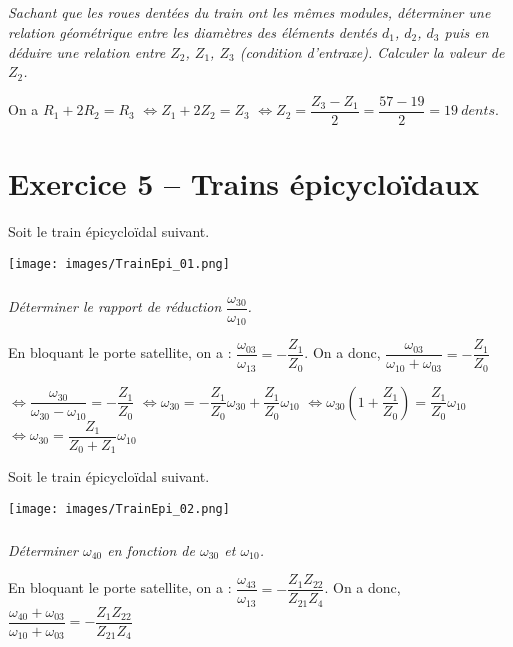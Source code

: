 \documentclass[10pt,fleqn]{article} %
\begin{document}
\begin{multicols}{2}
\begin{multicols}{2}
\subparagraph{}
\textit{Sachant que les roues dentées du train ont les mêmes modules, déterminer une relation géométrique entre les diamètres des éléments dentés $d_1$, $d_2$, $d_3$ puis en déduire une relation entre $Z_2$, $Z_1$, $Z_3$ (condition d’entraxe). Calculer la valeur de $Z_2$.}

 \ifprof
 \begin{corrige}
 On a $R_1+2R_2 = R_3$ $\Leftrightarrow Z_1+2Z_2 = Z_3$ $\Leftrightarrow Z_2 = \dfrac{Z_3- Z_1}{2}=\dfrac{57-19}{2}=\SI{19}{dents}$.
 \end{corrige}
 \else
 \fi



\section*{Exercice 5 -- Trains épicycloïdaux}
\setcounter{exo}{0}

Soit le train épicycloïdal suivant. 

\begin{center}
 \texttt{[image: images/TrainEpi\_01.png]}
\end{center}

\subparagraph{}
\textit{Déterminer le rapport de réduction $\dfrac{\omega_{30}}{\omega_{10}}$.}
 \ifprof
 \begin{corrige}
 
 En bloquant le porte satellite, on a : $\dfrac{\omega_{03}}{\omega_{13}}=-\dfrac{Z_1}{Z_0}$. On a donc, 
$\dfrac{\omega_{03}}{\omega_{10}+\omega_{03}}=-\dfrac{Z_1}{Z_0}$

$\Leftrightarrow \dfrac{\omega_{30}}{\omega_{30}-\omega_{10}}=-\dfrac{Z_1}{Z_0}$
$\Leftrightarrow \omega_{30}=-\dfrac{Z_1}{Z_0} \omega_{30}+\dfrac{Z_1}{Z_0}\omega_{10} $
$\Leftrightarrow \omega_{30}\left( 1+\dfrac{Z_1}{Z_0} \right)=\dfrac{Z_1}{Z_0}\omega_{10} $
$\Leftrightarrow \omega_{30}=\dfrac{Z_1}{Z_0+Z_1}\omega_{10} $
 \end{corrige}
 \else
 \fi


Soit le train épicycloïdal suivant. 

\begin{center}
 \texttt{[image: images/TrainEpi\_02.png]}
\end{center}

\subparagraph{}
\textit{Déterminer $\omega_{40}$ en fonction de  $\omega_{30}$ et $\omega_{10}$.}
 \ifprof
 \begin{corrige}
 
 En bloquant le porte satellite, on a : $\dfrac{\omega_{43}}{\omega_{13}}=-\dfrac{Z_{1}Z_{22}}{Z_{21}Z_{4}}$.
  On a donc, 
  $\dfrac{\omega_{40}+\omega_{03}}{\omega_{10}+\omega_{03}}=-\dfrac{Z_{1}Z_{22}}{Z_{21}Z_{4}}$


\end{corrige}
\end{multicols}
\end{multicols}
\end{document}
